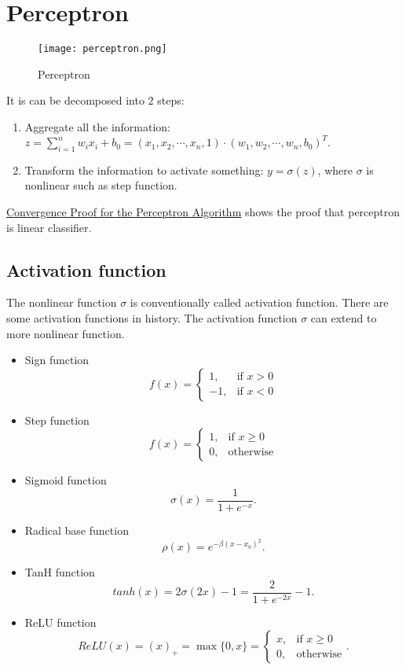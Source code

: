 \documentclass[titlestyle=hang,11pt]{elegantbook}
\begin{document}
\section{Perceptron}

\begin{figure}[!htbp]
	\centering
	\texttt{[image: perceptron.png]}
	\caption{Perceptron\label{fig:perceptron}}
\end{figure}
 
It is can be decomposed into $2$ steps:
\begin{enumerate}
	\item Aggregate all the information: $z=\sum_{i=1}^{n}w_ix_i+b_0=(x_1,x_2,\cdots,x_n,1)\cdot (w_1,w_2,\cdots,w_n,b_0)^{T}.$
	\item Transform the information to activate something: $y=\sigma(z)$, where $\sigma$ is nonlinear such as step function.
\end{enumerate}

\href{http://www.cs.columbia.edu/~mcollins/courses/6998-2012/notes/perc.converge.pdf}{Convergence Proof for the Perceptron Algorithm} shows the proof that perceptron is linear classifier.

\subsection{Activation function}

The nonlinear function $\sigma$ is conventionally called activation function.
There are some activation functions in history.
The activation function $\sigma$ can extend to more nonlinear function.
\begin{center}
\begin{itemize}
\item Sign function
   $$f(x)=
   \begin{cases}
	     1,&\text{if $x > 0$}\\
		-1,&\text{if $x < 0$}
	\end{cases}
   $$
\item Step function
	$$f(x)=
	\begin{cases}
		1,&\text{if $x\geq0$}\\
		0,&\text{otherwise}
	\end{cases}
    $$
\item Sigmoid function
    $$\sigma(x)=\frac{1}{1+e^{-x}}.$$

\item Radical base function
    $$\rho(x)=e^{-\beta(x-x_0)^2}.$$

\item TanH function
   $$tanh(x)=2\sigma(2x)-1=\frac{2}{1+e^{-2x}}-1.$$

\item ReLU function
   $$ReLU(x)={(x)}_{+}=\max\{0,x\}=
		\begin{cases}
			x,&\text{if $x\geq 0$}\\
			0,&\text{otherwise}
		\end{cases}.
   $$
\end{itemize}
\end{center}
\end{document}
